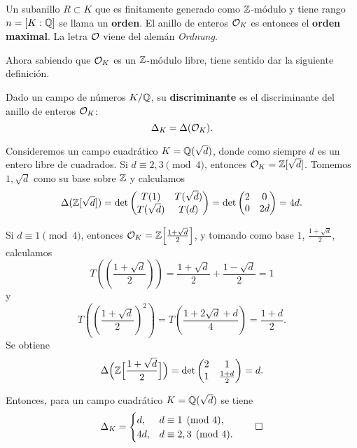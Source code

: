 Un subanillo $R \subset K$ que es finitamente generado como $\mathbb{Z}$-módulo y tiene
rango $n = [K : \mathbb{Q}]$ se llama un \textbf{orden}. El anillo de enteros $\mathcal{O}_K$ es
entonces el \textbf{orden maximal}. La letra $\mathcal{O}$ viene del alemán
\emph{Ordnung}.

\vspace{1em}

Ahora sabiendo que $\mathcal{O}_K$ es un $\mathbb{Z}$-módulo libre, tiene sentido dar
la siguiente definición.

\begin{definicion}
  Dado un campo de números $K/\mathbb{Q}$, su \textbf{discriminante} es el
  discriminante del anillo de enteros $\mathcal{O}_K$:
  $$\Delta_K = \Delta (\mathcal{O}_K).$$
\end{definicion}

\begin{ejemplo}
  Consideremos un campo cuadrático $K = \mathbb{Q} (\sqrt{d})$, donde como siempre $d$
  es un entero libre de cuadrados. Si $d \equiv 2,3\pmod{4}$, entonces
  $\mathcal{O}_K = \mathbb{Z} [\sqrt{d}]$. Tomemos $1, \sqrt{d}$ como su base sobre
  $\mathbb{Z}$ y calculamos
  \[ \Delta (\mathbb{Z} [\sqrt{d}]) = \det \begin{pmatrix}
    T (1) & T (\sqrt{d}) \\
    T (\sqrt{d}) & T (d)
  \end{pmatrix} = \det \begin{pmatrix}
    2 & 0 \\
    0 & 2d
  \end{pmatrix} = 4d. \]

  Si $d \equiv 1 \pmod{4}$, entonces
  $\mathcal{O}_K = \mathbb{Z} \Bigl[\frac{1+\sqrt{d}}{2}\Bigr]$, y tomando como base
  $1$, $\frac{1+\sqrt{d}}{2}$, calculamos
  \[ T \left(\left(\frac{1+\sqrt{d}}{2}\right)\right) =
     \frac{1+\sqrt{d}}{2} + \frac{1-\sqrt{d}}{2} = 1 \]
  y
  \[ T \left(\left(\frac{1+\sqrt{d}}{2}\right)^2\right) =
     T \left(\frac{1 + 2\sqrt{d} + d}{4}\right) = \frac{1+d}{2}. \]
  Se obtiene
  \[ \Delta \Bigl(\mathbb{Z}\Bigl[\frac{1+\sqrt{d}}{2}\Bigr]\Bigr) =
  \det \begin{pmatrix}
    2 & 1 \\
    1 & \frac{1+d}{2}
  \end{pmatrix} = d. \]

  Entonces, para un campo cuadrático $K = \mathbb{Q} (\sqrt{d})$ se tiene
  \[ \Delta_K = \begin{cases}
    d, & d \equiv 1 \pmod{4}, \\
    4d, & d \equiv 2,3 \pmod{4}.
  \end{cases} \qedhere \]
\end{ejemplo}

